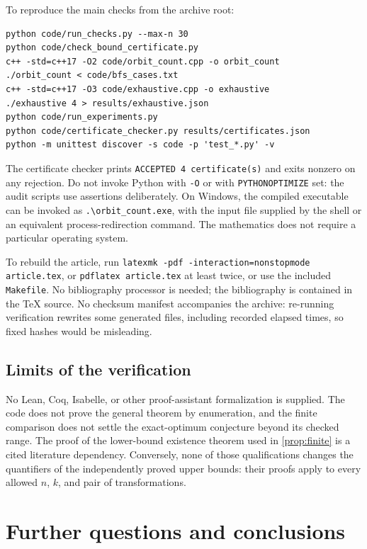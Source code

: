 \documentclass[11pt,a4paper]{article}
\numberwithin{equation}{section}
\theoremstyle{definition}
\theoremstyle{remark}
\begin{document}
To reproduce the main checks from the archive root:
\begin{lstlisting}
python code/run_checks.py --max-n 30
python code/check_bound_certificate.py
c++ -std=c++17 -O2 code/orbit_count.cpp -o orbit_count
./orbit_count < code/bfs_cases.txt
c++ -std=c++17 -O3 code/exhaustive.cpp -o exhaustive
./exhaustive 4 > results/exhaustive.json
python code/run_experiments.py
python code/certificate_checker.py results/certificates.json
python -m unittest discover -s code -p 'test_*.py' -v
\end{lstlisting}
The certificate checker prints \texttt{ACCEPTED 4 certificate(s)} and exits
nonzero on any rejection. Do not invoke Python with \texttt{-O} or with
\texttt{PYTHONOPTIMIZE} set: the audit scripts use assertions deliberately.
On Windows, the compiled executable can be invoked as
\texttt{.\textbackslash orbit\_count.exe}, with the input file supplied by the
shell or an equivalent process-redirection command. The mathematics does not
require a particular operating system.

To rebuild the article, run
\texttt{latexmk -pdf -interaction=nonstopmode article.tex}, or
\texttt{pdflatex article.tex} at least twice, or use the included
\texttt{Makefile}. No bibliography processor is needed; the bibliography is
contained in the TeX source. No checksum manifest accompanies the archive:
re-running verification rewrites some generated files, including recorded
elapsed times, so fixed hashes would be misleading.

\subsection{Limits of the verification}

No Lean, Coq, Isabelle, or other proof-assistant formalization is supplied.
The code does not prove the general theorem by enumeration, and the finite
comparison does not settle the exact-optimum conjecture beyond its checked
range. The proof of the lower-bound existence theorem used in
\cref{prop:finite} is a cited literature dependency. Conversely, none of those
qualifications changes the quantifiers of the independently proved upper
bounds: their proofs apply to every allowed $n$, $k$, and pair of
transformations.

\section{Further questions and conclusions}\label{sec:conclusion}
\end{document}

